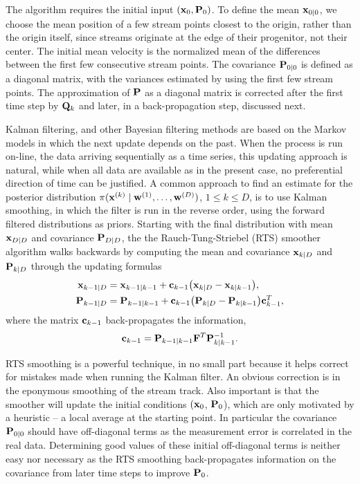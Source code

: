 \documentclass[fleqn,usenatbib]{mnras}
\begin{document}
    The algorithm requires the initial input $(\mathbf{x}_0,\mathbf{P}_0)$. To define
    the mean $\mathbf{x}_{0\mid 0}$, we choose the mean position of a few  stream
    points closest to the origin, rather than the origin itself, since streams
    originate at the edge of their progenitor, not their center. The initial
    mean velocity is the normalized mean of the differences between the first
    few consecutive stream points. The covariance $\mathbf{P}_{0\mid 0}$ is defined
    as a diagonal matrix, with the variances estimated by using the first few
    stream points. The approximation of $\mathbf{P}$ as a diagonal matrix is
    corrected after the first time step by $\mathbf{Q}_k$ and later, in a
    back-propagation step, discussed next.
    
    Kalman filtering, and other Bayesian filtering methods are based on the
    Markov models in which the next update depends on the past. When the process
    is run on-line, the data arriving sequentially as a time series, this
    updating approach is natural, while when all data are available as in the
    present case, no preferential direction of time can be justified. A common
    approach to find an estimate for the posterior distribution
    $\pi(\mathbf{x}^{(k)}\mid \mathbf{w}^{(1)},\ldots,\mathbf{w}^{(D)})$, $1\leq k\leq
    D$, is to use Kalman smoothing, in which the filter is run in the reverse
    order, using the forward filtered distributions as priors.  Starting with
    the final distribution with mean $\mathbf{x}_{D\mid D}$ and covariance
    $\mathbf{P}_{D\mid D}$, the  the Rauch-Tung-Striebel (RTS) smoother
    \cite{RTS1965} algorithm walks backwards by computing the mean and
    covariance $\mathbf{x}_{k\mid D}$ and $\mathbf{P}_{k\mid D}$ through the updating
    formulas
    \begin{align}
        \mathbf{x}_{k-1\mid D} &= \mathbf{x}_{k-1\mid k-1} + \mathbf{c}_{k-1}\big(\mathbf{x}_{k\mid D} - \mathbf{x}_{k\mid k-1}\big),
        \\
        \mathbf{P}_{k-1\mid D} &= \mathbf{P}_{k-1\mid k-1} +\mathbf{c}_{k-1}\big(\mathbf{P}_{k\mid D} - \mathbf{P}_{k\mid k-1}\big)\mathbf{c}_{k-1}^T,
     \end{align}
    where  the matrix $\mathbf{c}_{k-1}$ back-propagates the information,
    \begin{equation}
        \mathbf{c}_{k-1} = \mathbf{P}_{k-1\mid k-1}\mathbf{F}^T\mathbf{P}_{k\mid k-1}^{-1}.
    \end{equation}

    RTS smoothing is a powerful technique, in no small part because it helps
    correct for mistakes made when running the Kalman filter. An obvious
    correction is in the eponymous smoothing of the stream track. Also important
    is that the smoother will update the initial conditions $(\mathbf{x}_0$,
    $\mathbf{P}_0$), which are only motivated by a heuristic -- a local average at
    the starting point. In particular the covariance $\mathbf{P}_{0\mid 0}$ should
    have off-diagonal terms as the measurement error is correlated in the real
    data. Determining good values of these initial off-diagonal terms is neither
    easy nor necessary as the RTS smoothing back-propagates information on the
    covariance from later time steps to improve $\mathbf{P}_0$.
\end{document}
